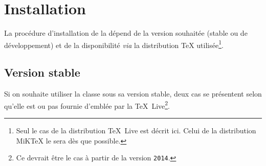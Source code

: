 \chapter{Installation}
\label{cha:installation}

La procédure d'installation de la \yatcl{} dépend de la version souhaitée
(stable ou de développement) et de la disponibilité \emph{via} la distribution
\TeX{} utilisée\footnote{Seul le cas de la distribution \TeX~Live est décrit
  ici. Celui de la distribution MiK\TeX{} le sera dès que possible.}.

\section{Version stable}
\label{sec:version-stable}

Si on souhaite utiliser la classe sous sa version stable, deux cas se
présentent selon qu'elle est ou pas fournie d'emblée par la
\TeX~Live\footnote{Ce devrait être le cas à partir de la version
  \texttt{2014}.}.
